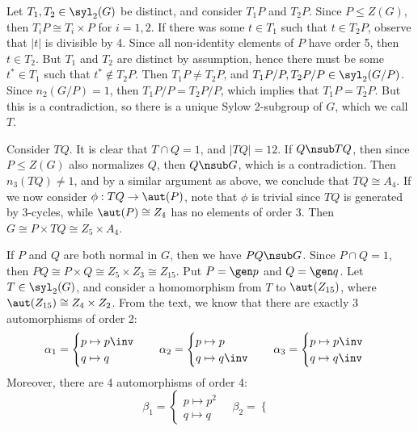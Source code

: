 \begin{solalph}
    Let $T_1, T_2 \in \syl_2(G)$ be distinct, and consider $T_1P$ and $T_2P$. Since $P \leq Z(G)$, then $T_iP \cong T_i \times P$ for $i = 1, 2$. If there was some $t \in T_1$ such that $t \in T_2P$, observe that $|t|$ is divisible by 4. Since all non-identity elements of $P$ have order 5, then $t \in T_2$. But $T_1$ and $T_2$ are distinct by assumption, hence there must be some $t^* \in T_1$ such that $t^* \not\in T_2P$. Then $T_1P \neq T_2P$, and $T_1P/P, T_2P/P \in \syl_2(G/P)$. Since $n_2(G/P) = 1$, then $T_1P/P = T_2P/P$, which implies that $T_1P = T_2P$. But this is a contradiction, so there is a unique Sylow 2-subgroup of $G$, which we call $T$.

    Consider $TQ$. It is clear that $T \cap Q = 1$, and $|TQ| = 12$. If $Q \nsub TQ$, then since $P \leq Z(G)$ also normalizes $Q$, then $Q \nsub G$, which is a contradiction. Then $n_3(TQ) \neq 1$, and by a similar argument as above, we conclude that $TQ \cong A_4$. If we now consider $\phi : TQ \to \aut(P)$, note that $\phi$ is trivial since $TQ$ is generated by 3-cycles, while $\aut(P) \cong Z_4$ has no elements of order 3. Then $G \cong P \times TQ \cong Z_5 \times A_4$.
    \item If $P$ and $Q$ are both normal in $G$, then we have $PQ \nsub G$. Since $P \cap Q = 1$, then $PQ \cong P \times Q \cong Z_5 \times Z_3 \cong Z_{15}$. Put $P = \gen p$ and $Q = \gen q$. Let $T \in \syl_2(G)$, and consider a homomorphism from $T$ to $\aut(Z_{15})$, where $\aut(Z_{15}) \cong Z_4 \times Z_2$. From the text, we know that there are exactly 3 automorphisms of order 2:
    \[\alpha_1 = 
    \begin{cases}
        p \mapsto p\inv \\
        q \mapsto q
    \end{cases} \quad
    \alpha_2 = 
    \begin{cases}
        p \mapsto p \\
        q \mapsto q\inv
    \end{cases} \quad
    \alpha_3 = 
    \begin{cases}
        p \mapsto p\inv \\
        q \mapsto q\inv
    \end{cases}\]
    Moreover, there are 4 automorphisms of order 4:
    \[\beta_1 = 
    \begin{cases}
        p \mapsto p^2 \\
        q \mapsto q
    \end{cases} \quad
    \beta_2 =
    \begin{cases}

\end{cases}\]
\end{solalph}

